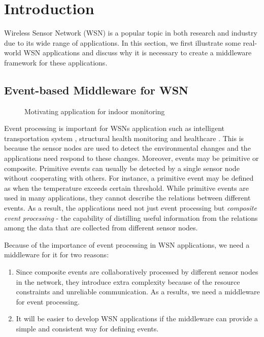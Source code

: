 \section{Introduction}
\label{sec:introduction}
Wireless Sensor Network (WSN) is a popular topic in both research and industry due to its wide range of applications. In this section, we first illustrate some real-world WSN applications and discuss why it is necessary to create a middleware framework for these applications.

\subsection{Event-based Middleware for WSN}

\begin{figure}
\centering
{}
\caption{Motivating application for indoor monitoring}
\label{fig:rooms}
\end{figure}

Event processing is important for WSNs application such as intelligent transportation system \cite{klein:its}, structural health monitoring \cite{lynch:shm} and healthcare \cite{lo:ban}. This is because the sensor nodes are used to detect the environmental changes and the applications need respond to these changes. Moreover, events may be primitive or composite. Primitive events can usually be detected by a single sensor node without cooperating with others. For instance, a primitive event may be defined as when the temperature exceeds certain threshold. While primitive events are used in many applications, they cannot describe the relations between different events. As a result, the applications need not just event processing but \emph{composite event processing} - the capability of distilling useful information from the relations among the data that are collected from different sensor nodes.

Because of the importance of event processing in WSN applications, we need a middleware for it for two reasons:
\begin{enumerate}
\item Since composite events are collaboratively processed by different sensor nodes in the network, they introduce extra complexity because of the resource constraints and unreliable communication. As a results, we need a middleware for event processing.
\item It will be easier to develop WSN applications if the middleware can provide a simple and consistent way for defining events.
\end{enumerate}

